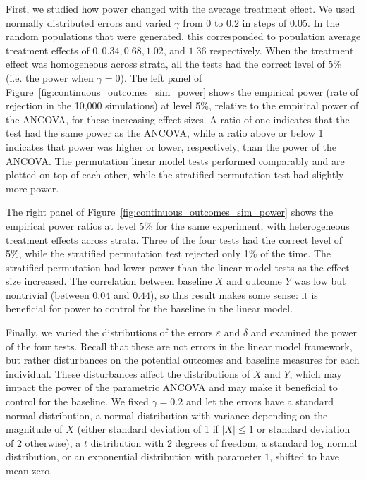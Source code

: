 \documentclass[12pt]{article}
\begin{document}
First, we studied how power changed with the average treatment effect.
We used normally distributed errors and varied $\gamma$ from $0$ to $0.2$ in steps of $0.05$.
In the random populations that were generated, this corresponded to population average treatment effects of $0, 0.34, 0.68, 1.02$, and $1.36$ respectively.
When the treatment effect was homogeneous across strata, all the tests had the correct level of 5\% (i.e. the power when $\gamma = 0$).
The left panel of Figure~\ref{fig:continuous_outcomes_sim_power} shows the empirical power (rate of rejection in the 10,000 simulations) at level 5\%, relative to the empirical power of the ANCOVA, for these increasing effect sizes.
A ratio of one indicates that the test had the same power as the ANCOVA, while a ratio above or below 1 indicates that power was higher or lower, respectively, than the power of the ANCOVA.
The permutation linear model tests performed comparably and are plotted on top of each other, while the stratified permutation test had slightly more power.

The right panel of Figure~\ref{fig:continuous_outcomes_sim_power} shows the empirical power ratios at level 5\% for the same experiment, with heterogeneous treatment effects across strata.
Three of the four tests had the correct level of 5\%, while the stratified permutation test rejected only 1\% of the time.
The stratified permutation had lower power than the linear model tests as the effect size increased.
The correlation between baseline $X$ and outcome $Y$ was low but nontrivial (between $0.04$ and $0.44$), so this result makes some sense:
it is beneficial for power to control for the baseline in the linear model.

Finally, we varied the distributions of the errors $\varepsilon$ and $\delta$ and examined the power of the four tests.
Recall that these are not errors in the linear model framework, but rather disturbances on the potential outcomes and baseline measures for each individual.
These disturbances affect the distributions of $X$ and $Y$, which may impact the power of the parametric ANCOVA and may make it beneficial to control for the baseline.
We fixed $\gamma=0.2$ and let the errors have a standard normal distribution, a normal distribution with variance depending on the magnitude of $X$ (either standard deviation of 1 if $\lvert X \rvert \leq 1$ or standard deviation of 2 otherwise), a $t$ distribution with 2 degrees of freedom, a standard log normal distribution, or an exponential distribution with parameter $1$, shifted to have mean zero.
\end{document}
